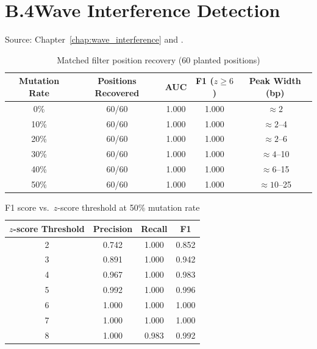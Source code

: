 \section*{B.4\quad Wave Interference Detection}
\label{app:interference_table}

\noindent
Source: Chapter~\ref{chap:wave_interference} and \citet{Sachikonye2025_Interference}.

\vspace{6pt}

\begin{table}[H]
\centering
\caption{Matched filter position recovery (60 planted positions)}
\label{tab:position_recovery}
\begin{tabular}{ccccc}
\toprule
Mutation Rate & Positions Recovered & AUC & F1 ($z\geq 6$) & Peak Width (bp) \\
\midrule
0\%  & 60/60 & 1.000 & 1.000 & $\approx 2$ \\
10\% & 60/60 & 1.000 & 1.000 & $\approx 2$--4 \\
20\% & 60/60 & 1.000 & 1.000 & $\approx 2$--6 \\
30\% & 60/60 & 1.000 & 1.000 & $\approx 4$--10 \\
40\% & 60/60 & 1.000 & 1.000 & $\approx 6$--15 \\
50\% & 60/60 & 1.000 & 1.000 & $\approx 10$--25 \\
\bottomrule
\end{tabular}
\end{table}

\begin{table}[H]
\centering
\caption{F1 score vs.\ $z$-score threshold at 50\% mutation rate}
\label{tab:f1_zscore}
\begin{tabular}{cccc}
\toprule
$z$-score Threshold & Precision & Recall & F1 \\
\midrule
2 & 0.742 & 1.000 & 0.852 \\
3 & 0.891 & 1.000 & 0.942 \\
4 & 0.967 & 1.000 & 0.983 \\
5 & 0.992 & 1.000 & 0.996 \\
6 & 1.000 & 1.000 & 1.000 \\
7 & 1.000 & 1.000 & 1.000 \\
8 & 1.000 & 0.983 & 0.992 \\
\bottomrule
\end{tabular}
\end{table}

